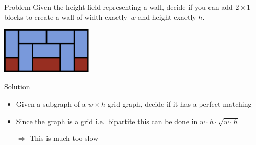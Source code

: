 \begin{frame}
  \frametitle{\problemtitle}
  \begin{block}{Problem}
  	Given the height field representing a wall, decide if you can add $2\times1$ blocks to create a wall of width exactly~$w$ and height exactly $h$.
  \end{block}
  \begin{center}
  	\includegraphics[width=0.33\textwidth]{sample}
  \end{center}
  \pause
  \begin{block}{Solution}
  	\begin{itemize}
  		\item Given a subgraph of a $w \times h$ grid graph, decide if it has a perfect matching
  		\item Since the graph is a grid i.e.\ bipartite this can be done in $w\cdot h\cdot \sqrt{w\cdot h}$
  		\pause
  		\item [$\Rightarrow$] This is much too slow
  	\end{itemize}
  \end{block}
\end{frame}




